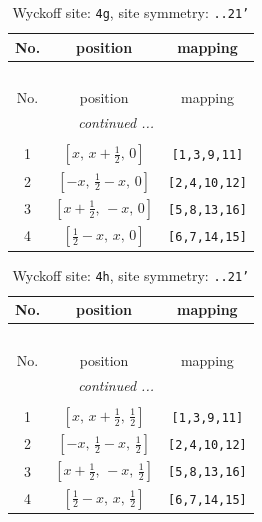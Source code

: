 \documentclass[fleqn,8pt]{jsarticle}
\begin{document}
\renewcommand{\arraystretch}{1.2}
\begin{longtable}{ccc}
\caption{Wyckoff site: {\tt 4g}, site symmetry: {\tt ..21'}}
 \\
 \hline \hline
No. & position & mapping \\ \hline \endfirsthead

\multicolumn{2}{l}{\tablename\ \thetable{}} \\
 \hline \hline
No. & position & mapping \\ \hline \endhead

 \hline \hline
\multicolumn{2}{r}{\footnotesize\it continued ...} \\ \endfoot

 \hline \hline
\multicolumn{2}{r}{} \\ \endlastfoot

1 & $\left[ x,\, x + \frac{1}{2},\, 0 \right]$ & {\tt [1,3,9,11]} \\ \hline
2 & $\left[ - x,\, \frac{1}{2} - x,\, 0 \right]$ & {\tt [2,4,10,12]} \\ \hline
3 & $\left[ x + \frac{1}{2},\, - x,\, 0 \right]$ & {\tt [5,8,13,16]} \\ \hline
4 & $\left[ \frac{1}{2} - x,\, x,\, 0 \right]$ & {\tt [6,7,14,15]} \\
\end{longtable}
\renewcommand{\arraystretch}{1.2}
\begin{longtable}{ccc}
\caption{Wyckoff site: {\tt 4h}, site symmetry: {\tt ..21'}}
 \\
 \hline \hline
No. & position & mapping \\ \hline \endfirsthead

\multicolumn{2}{l}{\tablename\ \thetable{}} \\
 \hline \hline
No. & position & mapping \\ \hline \endhead

 \hline \hline
\multicolumn{2}{r}{\footnotesize\it continued ...} \\ \endfoot

 \hline \hline
\multicolumn{2}{r}{} \\ \endlastfoot

1 & $\left[ x,\, x + \frac{1}{2},\, \frac{1}{2} \right]$ & {\tt [1,3,9,11]} \\ \hline
2 & $\left[ - x,\, \frac{1}{2} - x,\, \frac{1}{2} \right]$ & {\tt [2,4,10,12]} \\ \hline
3 & $\left[ x + \frac{1}{2},\, - x,\, \frac{1}{2} \right]$ & {\tt [5,8,13,16]} \\ \hline
4 & $\left[ \frac{1}{2} - x,\, x,\, \frac{1}{2} \right]$ & {\tt [6,7,14,15]} \\
\end{longtable}
\end{document}
